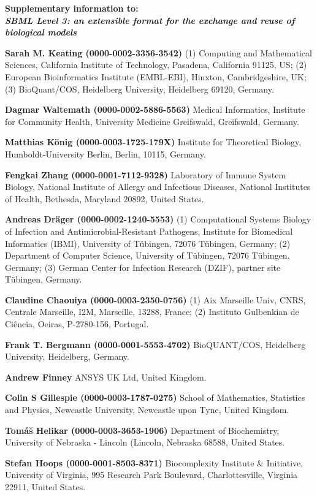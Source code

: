 \documentclass{sbml-paper}
\begin{document}
\begin{center}\large\bfseries
Supplementary information to:\\
\emph{SBML Level 3: an extensible format for the exchange and reuse of biological models}
\end{center}

\textbf{Sarah M. Keating (0000-0002-3356-3542)} (1) Computing and Mathematical Sciences, California Institute of Technology, Pasadena, California 91125, US; (2) European Bioinformatics Institute (EMBL-EBI), Hinxton, Cambridgeshire, UK; (3) BioQuant/COS, Heidelberg University, Heidelberg 69120, Germany.

\textbf{Dagmar Waltemath (0000-0002-5886-5563)} Medical Informatics, Institute for Community Health, University Medicine Greifswald, Greifswald, Germany.

\textbf{Matthias K\"{o}nig (0000-0003-1725-179X)} Institute for Theoretical Biology, Humboldt-University Berlin, Berlin, 10115, Germany.

\textbf{Fengkai Zhang (0000-0001-7112-9328)} Laboratory of Immune System Biology, National Institute of Allergy and Infectious Diseases, National Institutes of Health, Bethesda, Maryland 20892, United States.

\textbf{Andreas Dräger (0000-0002-1240-5553)} (1) Computational Systems Biology of Infection and Antimicrobial-Resistant Pathogens, Institute for Biomedical Informatics (IBMI), University of Tübingen, 72076 Tübingen, Germany; (2) Department of Computer Science, University of Tübingen, 72076 Tübingen, Germany; (3) German Center for Infection Research (DZIF), partner site Tübingen, Germany.

\textbf{Claudine Chaouiya (0000-0003-2350-0756)} (1) Aix Marseille Univ, CNRS, Centrale Marseille, I2M, Marseille, 13288, France; (2) Instituto Gulbenkian de Ciência, Oeiras, P-2780-156, Portugal.

\textbf{Frank T. Bergmann (0000-0001-5553-4702)} BioQUANT/COS, Heidelberg University, Heidelberg, Germany.

\textbf{Andrew Finney} ANSYS UK Ltd, United Kingdom.
	
\textbf{Colin S Gillespie (0000-0003-1787-0275)} School of Mathematics, Statistics and Physics, Newcastle University, Newcastle upon Tyne, United Kingdom.

\textbf{Tomáš Helikar (0000-0003-3653-1906)} Department of Biochemistry, University of Nebraska - Lincoln (Lincoln, Nebraska 68588, United States.

\textbf{Stefan Hoops (0000-0001-8503-8371)} Biocomplexity Institute \& Initiative, University of Virginia, 995 Research Park Boulevard, Charlottesville, Virginia 22911, United States.
\end{document}
